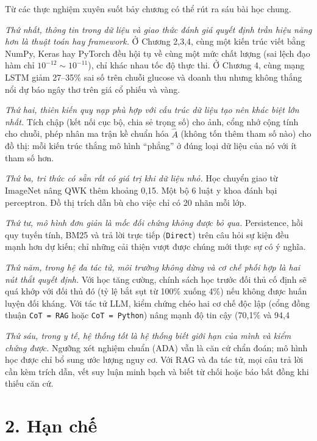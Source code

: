 Từ các thực nghiệm xuyên suốt bảy chương có thể rút ra sáu bài học chung.

\emph{Thứ nhất, thông tin trong dữ liệu và giao thức đánh giá quyết định trần hiệu năng hơn là thuật toán hay framework.} Ở Chương 2,3,4, cùng một kiến trúc viết bằng NumPy, Keras hay PyTorch đều hội tụ về cùng một mức chất lượng (sai lệch đạo hàm chỉ $10^{-12}\sim 10^{-11}$), chỉ khác nhau tốc độ thực thi. Ở Chương 4, cùng mạng LSTM giảm 27–35\% sai số trên chuỗi glucose và doanh thu nhưng không thắng nổi dự báo ngây thơ trên giá cổ phiếu và vàng.

\emph{Thứ hai, thiên kiến quy nạp phù hợp với cấu trúc dữ liệu tạo nên khác biệt lớn nhất.} Tích chập (kết nối cục bộ, chia sẻ trọng số) cho ảnh, cổng nhớ cộng tính cho chuỗi, phép nhân ma trận kề chuẩn hóa $\hat A$ (không tốn thêm tham số nào) cho đồ thị: mỗi kiến trúc thắng mô hình ``phẳng'' ở đúng loại dữ liệu của nó với ít tham số hơn.

\emph{Thứ ba, tri thức có sẵn rất có giá trị khi dữ liệu nhỏ.} Học chuyển giao từ ImageNet nâng QWK thêm khoảng 0,15. Một bộ 6 luật y khoa đánh bại perceptron. Đồ thị trích dẫn bù cho việc chỉ có 20 nhãn mỗi lớp.

\emph{Thứ tư, mô hình đơn giản là mốc đối chứng không được bỏ qua.} Persistence, hồi quy tuyến tính, BM25 và trả lời trực tiếp (\texttt{Direct}) trên câu hỏi sự kiện đều mạnh hơn dự kiến; chỉ những cải thiện vượt được chúng mới thực sự có ý nghĩa.

\emph{Thứ năm, trong hệ đa tác tử, môi trường không dừng và cơ chế phối hợp là hai nút thắt quyết định.} Với học tăng cường, chính sách học trước đối thủ cố định sẽ quá khớp với đối thủ đó (tỷ lệ bắt sụt từ 100\% xuống 4\%) nếu không được huấn luyện đối kháng. Với tác tử LLM, kiểm chứng chéo hai cơ chế độc lập (cổng đồng thuận \texttt{CoT = RAG} hoặc \texttt{CoT = Python}) nâng mạnh độ tin cậy (70,1\% và 94,4%

\emph{Thứ sáu, trong y tế, hệ thống tốt là hệ thống biết giới hạn của mình và kiểm chứng được.} Ngưỡng xét nghiệm chuẩn (ADA) vẫn là căn cứ chẩn đoán; mô hình học được chỉ bổ sung ước lượng nguy cơ. Với RAG và đa tác tử, mọi câu trả lời cần kèm trích dẫn, vết suy luận minh bạch và biết từ chối hoặc báo bất đồng khi thiếu căn cứ.

\section*{2. Hạn chế}

